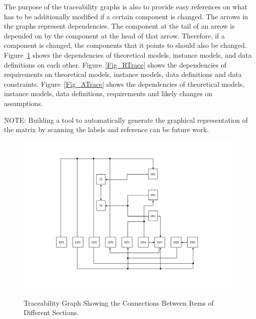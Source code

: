 \documentclass[12pt]{article}
\begin{document}
\newpage

The purpose of the traceability graphs is also to provide easy references 
on what has to be additionally modified if a certain component is changed.  
The arrows in the graphs represent dependencies. The component at the 
tail of an arrow is depended on by the component at the head of that arrow. 
Therefore, if a component is changed, the components that it points to should 
also be changed. Figure~\ref{Fig_Trace} shows the dependencies of 
theoretical models, instance models, and data definitions on each other. 
Figure~\ref{Fig_RTrace} shows the dependencies of requirements on 
theoretical models, instance models, data definitions and data constraints.
Figure~\ref{Fig_ATrace} shows the dependencies of theoretical models,
instance models, data definitions, requirements and likely changes on assumptions.
 
NOTE: Building a tool to automatically generate the graphical 
representation of the matrix by scanning the labels and reference can be 
future work.

\begin{figure}[h!]
	\begin{center}
		{
			\includegraphics[width=\textwidth]{Trace.png}
		}
		\caption{\label{Fig_Trace} Traceability Graph Showing the Connections Between Items of Different Sections.}
	\end{center}
\end{figure}
\end{document}
